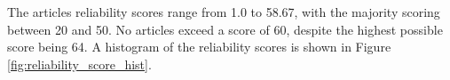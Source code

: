 The articles reliability scores range from 1.0 to 58.67, with the majority scoring between 20 and 50. No articles  exceed a score of 60, despite the highest possible score being 64. A histogram of the reliability scores is shown in Figure \ref{fig:reliability_score_hist}.


